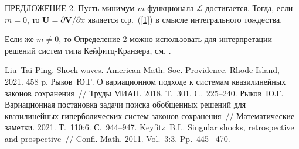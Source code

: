 ПРЕДЛОЖЕНИЕ 2. Пусть минимум $m$ функционала $\mathcal L$
достигается. Тогда, если $m=0$, то
$\mathbf{U}=\partial\mathbf{V}/\partial x$ является о.р.~(\ref{1})
в смысле интегрального тождества.

Если же $m\neq 0$, то Определение 2 можно использовать для
интерпретации решений систем типа Кейфитц-Кранзера, см. \cite{Key}.




%

\begin{thebibliography}{9} %
 Liu~Tai-Ping. Shock waves. American Math. Soc.
    Providence. Rhode Island, 2021. 458 p.
 Рыков~Ю.Г. О вариационном подходе к системам
    квазилинейных законов сохранения~// Труды МИАН. 2018. Т.~301.
    С.~225--240.
 Рыков~Ю.Г. Вариационная постановка задачи поиска
    обобщенных решений для квазилинейных гиперболических систем законов
    сохранения~// Математические заметки. 2021. Т.~110:6. С.~944--947.
 Keyfitz~B.L. Singular shocks, retrospective and
    prospective~// Confl. Math. 2011. Vol.~3:3. Pp.~445-–470.
\end{thebibliography}






%
